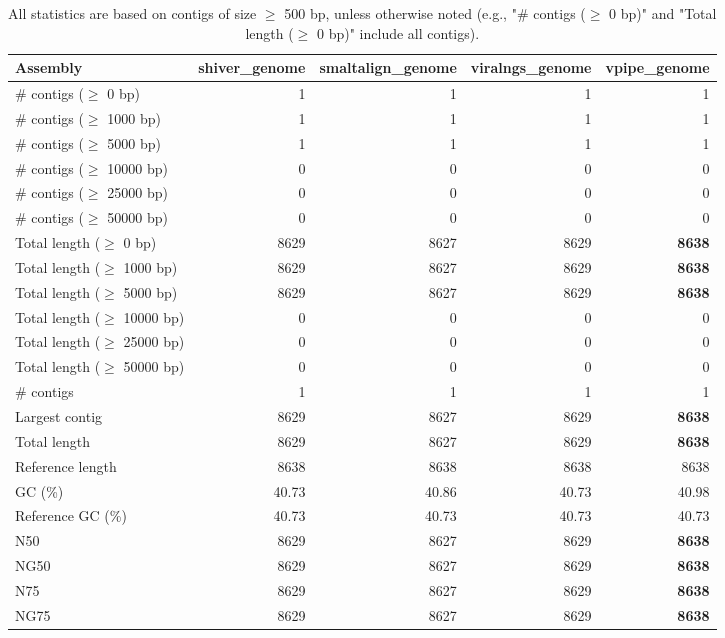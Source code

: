 \documentclass[12pt,a4paper]{article}
\begin{document}
\begin{table}[ht]
\begin{center}
\caption{All statistics are based on contigs of size $\geq$ 500 bp, unless otherwise noted (e.g., "\# contigs ($\geq$ 0 bp)" and "Total length ($\geq$ 0 bp)" include all contigs).}
\begin{tabular}{|l*{4}{|r}|}
\hline
Assembly & shiver\_genome & smaltalign\_genome & viralngs\_genome & vpipe\_genome \\ \hline
\# contigs ($\geq$ 0 bp) & 1 & 1 & 1 & 1 \\ \hline
\# contigs ($\geq$ 1000 bp) & 1 & 1 & 1 & 1 \\ \hline
\# contigs ($\geq$ 5000 bp) & 1 & 1 & 1 & 1 \\ \hline
\# contigs ($\geq$ 10000 bp) & 0 & 0 & 0 & 0 \\ \hline
\# contigs ($\geq$ 25000 bp) & 0 & 0 & 0 & 0 \\ \hline
\# contigs ($\geq$ 50000 bp) & 0 & 0 & 0 & 0 \\ \hline
Total length ($\geq$ 0 bp) & 8629 & 8627 & 8629 & {\bf 8638} \\ \hline
Total length ($\geq$ 1000 bp) & 8629 & 8627 & 8629 & {\bf 8638} \\ \hline
Total length ($\geq$ 5000 bp) & 8629 & 8627 & 8629 & {\bf 8638} \\ \hline
Total length ($\geq$ 10000 bp) & 0 & 0 & 0 & 0 \\ \hline
Total length ($\geq$ 25000 bp) & 0 & 0 & 0 & 0 \\ \hline
Total length ($\geq$ 50000 bp) & 0 & 0 & 0 & 0 \\ \hline
\# contigs & 1 & 1 & 1 & 1 \\ \hline
Largest contig & 8629 & 8627 & 8629 & {\bf 8638} \\ \hline
Total length & 8629 & 8627 & 8629 & {\bf 8638} \\ \hline
Reference length & 8638 & 8638 & 8638 & 8638 \\ \hline
GC (\%) & 40.73 & 40.86 & 40.73 & 40.98 \\ \hline
Reference GC (\%) & 40.73 & 40.73 & 40.73 & 40.73 \\ \hline
N50 & 8629 & 8627 & 8629 & {\bf 8638} \\ \hline
NG50 & 8629 & 8627 & 8629 & {\bf 8638} \\ \hline
N75 & 8629 & 8627 & 8629 & {\bf 8638} \\ \hline
NG75 & 8629 & 8627 & 8629 & {\bf 8638} \\ \hline

\end{tabular}
\end{center}
\end{table}
\end{document}

